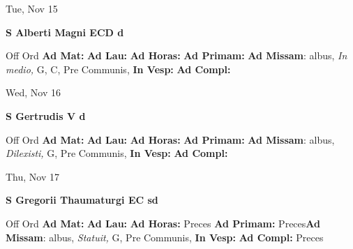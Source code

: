 \documentclass[10pt]{memoir}
\begin{document}
\begin{center}
\begin{minipage}{3.5in}
\vspace{2em}
\begin{center}Tue, Nov 15
\end{center}
\textbf{ \large S Alberti Magni ECD
\textnormal{\normalsize d}}

\begin{justify}Off Ord
\textbf{Ad Mat: }
\textbf{Ad Lau: }
\textbf{Ad Horas: }
\textbf{Ad Primam: }\textbf{Ad Missam}: albus, \textit{In medio,} G, C, Pre Communis, 
\textbf{In Vesp: }
\textbf{Ad Compl: }
\end{justify}
\end{minipage}
\end{center}

\begin{center}
\begin{minipage}{3.5in}
\vspace{2em}
\begin{center}Wed, Nov 16
\end{center}
\textbf{ \large S Gertrudis V
\textnormal{\normalsize d}}

\begin{justify}Off Ord
\textbf{Ad Mat: }
\textbf{Ad Lau: }
\textbf{Ad Horas: }
\textbf{Ad Primam: }\textbf{Ad Missam}: albus, \textit{Dilexisti,} G, Pre Communis, 
\textbf{In Vesp: }
\textbf{Ad Compl: }
\end{justify}
\end{minipage}
\end{center}

\begin{center}
\begin{minipage}{3.5in}
\vspace{2em}
\begin{center}Thu, Nov 17
\end{center}
\textbf{ \large S Gregorii Thaumaturgi EC
\textnormal{\normalsize sd}}

\begin{justify}Off Ord
\textbf{Ad Mat: }
\textbf{Ad Lau: }
\textbf{Ad Horas: }Preces
\textbf{Ad Primam: }Preces\textbf{Ad Missam}: albus, \textit{Statuit,} G, Pre Communis, 
\textbf{In Vesp: }
\textbf{Ad Compl: }Preces
\end{justify}
\end{minipage}
\end{center}
\end{document}
